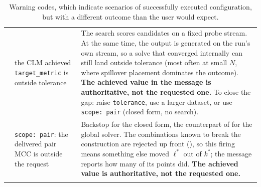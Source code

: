 \documentclass[a4paper,11pt]{article}
\newcommand{\vcode}[1]{\textcolor{valred}{\bfseries\ttfamily #1}}
\newcommand{\wcode}[1]{\textcolor{warnamber}{\bfseries\ttfamily #1}}
\begin{document}
\begin{longtable}{@{}L{1.0cm} L{5.2cm} L{8.8cm}@{}}
\wcode{309} & the CLM achieved \texttt{target\_metric} is outside tolerance & The search scores candidates on a fixed probe stream. At the same time, the output is generated on the run's own stream, so a solve that converged internally can still land outside tolerance (most often at small $N$, where spillover placement dominates the outcome). \textbf{The achieved value in the message is authoritative, not the requested one.} To close the gap: raise \texttt{tolerance}, use a larger dataset, or use \texttt{scope: pair} (closed form, no search). \\
\wcode{310} & \texttt{scope: pair}: the delivered pair MCC is outside the request & Backstop for the closed form, the counterpart of \wcode{309} for the global solver. The combinations known to break the construction are rejected up front (\vcode{130}), so this firing means something else moved $\ell^*$ out of $k^*$; the message reports how many of its points did. \textbf{The achieved value is authoritative, not the requested one.} \\
\bottomrule
\caption{Warning codes, which indicate scenarios of successfully executed configuration, but with a different outcome than the user would expect.}
\end{longtable}
\end{document}
